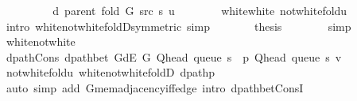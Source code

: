\begin{isabellebody}
\ \ \ \ \isamarkupfalse%
\ \isamarkupfalse%
\ {\isachardoublequoteopen}{\isachardot}{\kern0pt}{\isachardot}{\kern0pt}{\isachardot}{\kern0pt}\ {\isacharequal}{\kern0pt}\ d\ {\isacharparenleft}{\kern0pt}parent\ {\isacharparenleft}{\kern0pt}fold\ G\ src\ s{\isacharparenright}{\kern0pt}{\isacharparenright}{\kern0pt}\ u{\isachardoublequoteclose}\isanewline
\ \ \ \ \ \ \isamarkupfalse%
\ white{\isacharunderscore}{\kern0pt}white\ not{\isacharunderscore}{\kern0pt}white{\isacharunderscore}{\kern0pt}fold{\isacharunderscore}{\kern0pt}u\isanewline
\ \ \ \ \ \ \isamarkupfalse%
\ {\isacharparenleft}{\kern0pt}intro\ white{\isacharunderscore}{\kern0pt}not{\isacharunderscore}{\kern0pt}white{\isacharunderscore}{\kern0pt}foldD{\isacharparenleft}{\kern0pt}{}{\isacharparenright}{\kern0pt}{\isacharbrackleft}{\kern0pt}symmetric{\isacharbrackright}{\kern0pt}{\isacharparenright}{\kern0pt}\ simp\isanewline
\ \ \ \ \isamarkupfalse%
\ \isamarkupfalse%
\ {\isacharquery}{\kern0pt}thesis\isanewline
\ \ \ \ \ \ \isamarkupfalse%
\ simp\isanewline
\ \ \isamarkupfalse%
\isanewline
\ \ \ \ \isamarkupfalse%
\ white{\isacharunderscore}{\kern0pt}not{\isacharunderscore}{\kern0pt}white\isanewline
\ \ \ \ \isamarkupfalse%
\ dpath{\isacharunderscore}{\kern0pt}Cons{\isacharcolon}{\kern0pt}\ {\isachardoublequoteopen}dpath{\isacharunderscore}{\kern0pt}bet\ {\isacharparenleft}{\kern0pt}G{\isachardot}{\kern0pt}dE\ G{\isacharparenright}{\kern0pt}\ {\isacharparenleft}{\kern0pt}Q{\isacharunderscore}{\kern0pt}head\ {\isacharparenleft}{\kern0pt}queue\ s{\isacharparenright}{\kern0pt}\ {\isacharhash}{\kern0pt}\ p{\isacharparenright}{\kern0pt}\ {\isacharparenleft}{\kern0pt}Q{\isacharunderscore}{\kern0pt}head\ {\isacharparenleft}{\kern0pt}queue\ s{\isacharparenright}{\kern0pt}{\isacharparenright}{\kern0pt}\ v{\isachardoublequoteclose}\isanewline
\ \ \ \ \ \ \isamarkupfalse%
\ not{\isacharunderscore}{\kern0pt}white{\isacharunderscore}{\kern0pt}fold{\isacharunderscore}{\kern0pt}u\ white{\isacharunderscore}{\kern0pt}not{\isacharunderscore}{\kern0pt}white{\isacharunderscore}{\kern0pt}foldD{\isacharparenleft}{\kern0pt}{}{\isacharparenright}{\kern0pt}\ dpath{\isacharunderscore}{\kern0pt}p\isanewline
\ \ \ \ \ \ \isamarkupfalse%
\ {\isacharparenleft}{\kern0pt}auto\ simp\ add{\isacharcolon}{\kern0pt}\ G{\isachardot}{\kern0pt}mem{\isacharunderscore}{\kern0pt}adjacency{\isacharunderscore}{\kern0pt}iff{\isacharunderscore}{\kern0pt}edge\ intro{\isacharcolon}{\kern0pt}\ dpath{\isacharunderscore}{\kern0pt}bet{\isacharunderscore}{\kern0pt}ConsI{\isacharparenright}{\kern0pt}\isanewline

\end{isabellebody}

